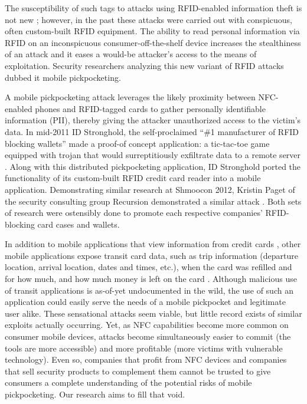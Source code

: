 \documentclass{IEEEtran}
\begin{document}
The susceptibility of such tags to attacks using RFID-enabled information theft is not new \cite{picking-virtual-pockets} \cite{eavesdropping-attacks-hfrfid-tokens}; however, in the past these attacks were carried out with conspicuous, often custom-built RFID equipment.  The ability to read personal information via RFID on an inconspicuous consumer-off-the-shelf device increases the stealthiness of an attack and it eases a would-be attacker's access to the means of exploitation.  Security researchers analyzing this new variant of RFID attacks dubbed it mobile pickpocketing.  

A mobile pickpocketing attack leverages the likely proximity between NFC-enabled phones and RFID-tagged cards to gather personally identifiable information (PII), thereby giving the attacker unauthorized access to the victim's data.  In mid-2011 ID Stronghold, the self-proclaimed ``\#1 manufacturer of RFID blocking wallets'' \cite{idstronghold-1} made a proof-of concept application:  a tic-tac-toe game equipped with trojan that would surreptitiously exfiltrate data to a remote server \cite{11alive-electronic-pickpocket-apps}.  Along with this distributed pickpocketing application, ID Stronghold ported the functionality of its custom-built RFID credit card reader into a mobile application.  Demonstrating similar research at Shmoocon 2012, Kristin Paget of the security consulting group Recursion demonstrated a similar attack \cite{forbes-1}.  Both sets of research were ostensibly done to promote each respective companies' RFID-blocking card cases and wallets.  

In addition to mobile applications that view information from credit cards \cite{idstronghold-1}, other mobile applications expose transit card data, such as trip information (departure location, arrival location, dates and times, etc.), when the card was refilled and for how much, and how much money is left on the card \cite{farebot-1}.  Although malicious use of transit applications is as-of-yet undocumented in the wild, the use of such an application could easily serve the needs of a mobile pickpocket and legitimate user alike.  These sensational attacks seem viable, but little record exists of similar exploits actually occurring.  Yet, as NFC capabilities become more common on consumer mobile devices, attacks become simultaneously easier to commit (the tools are more accessible) and more profitable (more victims with vulnerable technology).  Even so, companies that profit from NFC devices and companies that sell security products to complement them cannot be trusted to give consumers a complete understanding of the potential risks of mobile pickpocketing.  Our research aims to fill that void.
\end{document}
